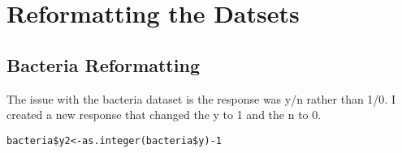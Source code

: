 \documentclass{article}
\begin{document}
%
%
%
%
%
%
%
%
%
%
%


\section{Reformatting the Datsets}
\subsection{Bacteria Reformatting}
The issue with the bacteria dataset is the response was y/n rather than 1/0. I created a new response that changed the y to 1 and the n to 0.

\begin{verbatim}
bacteria$y2<-as.integer(bacteria$y)-1
\end{verbatim}
\end{document}
